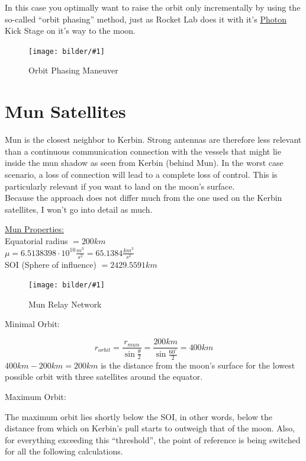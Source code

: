 \documentclass[12pt,paper=A4,numbers=noenddot,bibliography=totoc,listof=totoc,DIV=11,BCOR=1mm]{scrreprt}
\newcommand{\bildscaled}[4]{%
	\begin{figure}[htbp]
	\begin{center}
	\texttt{[image: bilder/\#1]}
	\caption{#3}\label{#2}
	\end{center}
	\end{figure}
}
\begin{document}
In this case you optimally want to raise the orbit only incrementally by using the so-called ``orbit phasing'' method, just as Rocket Lab does it with it's \href{https://youtu.be/zC8RxgL9tK4?t=680}{Photon} Kick Stage on it's way to the moon.
\bildscaled{orbit_phasing}{orbit_phasing}{Orbit Phasing Maneuver}{1.0}


\chapter{Mun Satellites}
Mun is the closest neighbor to Kerbin. Strong antennas are therefore less relevant than a continuous communication connection with the vessels that might lie inside the mun shadow as seen from Kerbin (behind Mun). In the worst case scenario, a loss of connection will lead to a complete loss of control. This is particularly relevant if you want to land on the moon's surface.\\

Because the approach does not differ much from the one used on the Kerbin satellites, I won't go into detail as much.
\medskip
\begin{flushright}
\href{https://wiki.kerbalspaceprogram.com/wiki/Mun}{Mun Properties:} \\
Equatorial radius $ = 200km$ \\
$\mu = 6.5138398 \cdot 10^{10} \frac{m^{3}}{s^{2}} = 65.1384 \frac{km^{3}}{s^{2}}$ \\
SOI (Sphere of influence) $ = 2429.5591 km$
\end{flushright}
\bildscaled{Mun}{mun}{Mun Relay Network}{0.5}
\pagebreak 
\begin{flushleft}
Minimal Orbit:
\end{flushleft}
\begin{equation*}
r_{orbit} = \frac{r_{mun}}{\sin \frac{\theta}{2}} = \frac{200km}{\sin \frac{60^\circ}{2}} = 400km
\end{equation*}
$400km - 200km = 200km$ is the distance from the moon's surface for the lowest possible orbit with three satellites around the equator.

\begin{flushleft}
Maximum Orbit:
\end{flushleft}
The maximum orbit lies shortly below the SOI, in other words, below the distance from which on Kerbin's pull starts to outweigh that of the moon.
Also, for everything exceeding this ``threshold'', the point of reference is being switched for all the following calculations.
\end{document}
